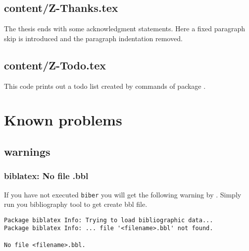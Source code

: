 
\section{content/Z-Thanks.tex}

The thesis ends with some acknowledgment statements. Here a fixed paragraph skip is introduced and the paragraph indentation removed.


\section{content/Z-Todo.tex}

This code prints out a todo list created by commands of package .



%
\chapter{Known problems}

\section{warnings}

\subsection{biblatex: No file .bbl}

If you have not executed \texttt{biber} you will get the following warning by
. Simply run you bibliography tool to get create bbl file.

\begin{verbatim}
Package biblatex Info: Trying to load bibliographic data...
Package biblatex Info: ... file '<filename>.bbl' not found.

No file <filename>.bbl.
\end{verbatim}

